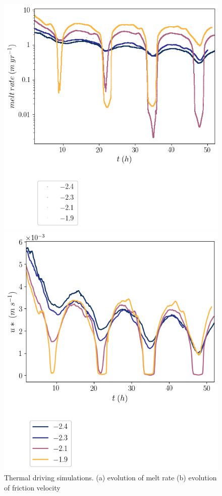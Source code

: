 \documentclass[draft]{styles/agujournal2019}
\begin{document}
\begin{figure}
    \centering
    \begin{minipage}{0.5\textwidth}
        \includegraphics[width=\textwidth]{Figures/melt_cmp_dT_t.png}
    \end{minipage}%
    \begin{minipage}{0.5\textwidth}
        \includegraphics[width=\textwidth]{Figures/us_cmp_dT_t.png}
    \end{minipage}%
    \caption{Thermal driving simulations. (a) evolution of melt rate (b) evolution of friction velocity}
    \label{fig:dT_timeseries}
\end{figure}
\end{document}
